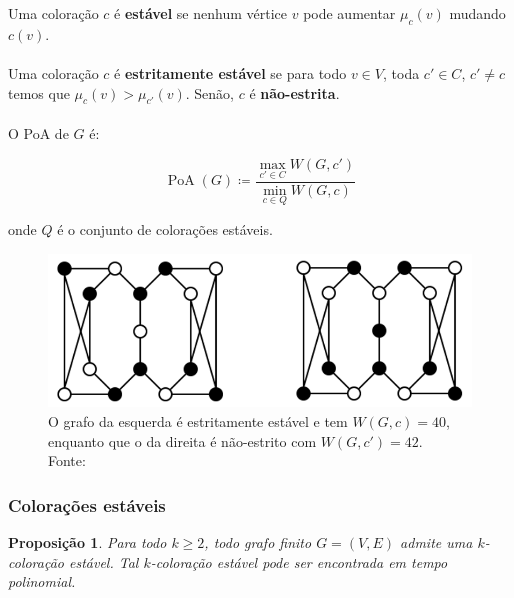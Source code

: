 \documentclass{beamer}
\DeclareMathOperator*{\PoA}{\text{PoA}}
\theoremstyle{plain}
\newtheorem{proposition}{Proposição}
\begin{document}
\begin{frame}
  Uma coloração $c$ é \textbf{estável} se nenhum vértice $v$ pode aumentar $\mu_c(v)$ mudando
  $c(v)$.\\~\\

  Uma coloração $c$ é \textbf{estritamente estável} se para todo $v\in V$, toda $c'\in C$, $c'\neq
  c$ temos que $\mu_c(v)>\mu_{c'}(v)$. Senão, $c$ é \textbf{não-estrita}.\\~\\

  O PoA de $G$ é:

  \begin{equation*}
    \PoA(G)\coloneqq\frac{\max_{c'\in C} W(G,c')}{\min_{c\in Q} W(G,c)}
  \end{equation*}

  onde $Q$ é o conjunto de colorações estáveis.
\end{frame}

\begin{frame}
  \begin{figure}[h]
    \centering\includegraphics[scale=0.3]{imgs/ex1.png}
    \captionsetup{justification=raggedright}
    \caption{O grafo da esquerda é estritamente estável e tem $W(G,c)=40$, enquanto que o da
    direita é não-estrito com $W(G,c')=42$. Fonte:~\cite{kun-et-al}}
  \end{figure}
\end{frame}

\begin{frame}
  \frametitle{Colorações estáveis}
  \begin{proposition}\label{prop-1} Para todo $k\geq 2$, todo grafo finito $G=(V,E)$ admite uma
    $k$-coloração estável. Tal $k$-coloração estável pode ser encontrada em tempo polinomial.
  \end{proposition}
\end{frame}
\end{document}
